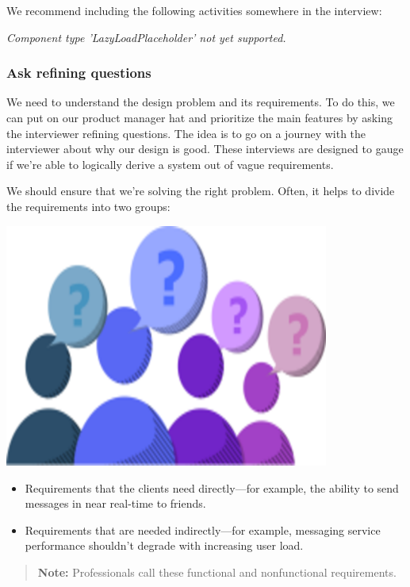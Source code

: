 We recommend including the following activities somewhere in the interview:

\textit{Component type 'LazyLoadPlaceholder' not yet supported.}

\subsubsection{Ask refining questions}\label{ask-refining-questions}

\noindent
\begin{minipage}[t]{0.48\textwidth}
We need to understand the design problem and its requirements. To do this, we can put on our product manager hat and prioritize the main features by asking the interviewer refining questions. The idea is to go on a journey with the interviewer about why our design is good. These interviews are designed to gauge if we're able to logically derive a system out of vague requirements.

We should ensure that we're solving the right problem. Often, it helps to divide the requirements into two groups:
\end{minipage}
\hfill
\begin{minipage}[t]{0.48\textwidth}
\includegraphics[width=0.8\textwidth]{Images/chapter_1/section_6043988183744512/5106597284413440.png}
\end{minipage}

\begin{itemize}
\tightlist
\item
Requirements that the clients need directly---for example, the ability to send messages in near real-time to friends.
\item
Requirements that are needed indirectly---for example, messaging service performance shouldn't degrade with increasing user load.
\end{itemize}
\begin{quote}
\textbf{Note:} Professionals call these functional and nonfunctional requirements.
\end{quote}

